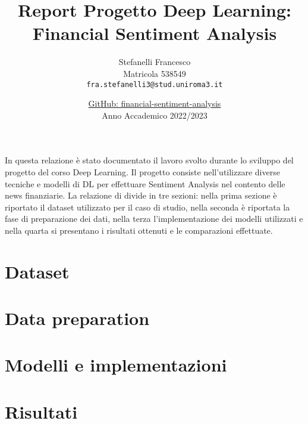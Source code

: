 \documentclass[11pt, english]{article}
\author{
 Stefanelli Francesco \\
 Matricola 538549\\
 \texttt{fra.stefanelli3@stud.uniroma3.it}
}
\title{\huge\textbf{Report Progetto Deep Learning: Financial Sentiment Analysis }}
\date{\href{https://github.com/Francesco9932/financial-sentiment-analysis}{GitHub: financial-sentiment-analysis}\\ Anno Accademico 2022/2023}
\begin{document}
\maketitle
In questa relazione è stato documentato il lavoro svolto durante lo sviluppo del progetto del corso Deep Learning. Il progetto consiste nell'utilizzare diverse tecniche e modelli di DL per effettuare Sentiment Analysis nel contento delle news finanziarie.
La relazione di divide in tre sezioni: nella prima sezione è riportato il dataset utilizzato per il caso di studio, nella seconda è riportata la fase di preparazione dei dati, nella terza l'implementazione dei modelli utilizzati e nella quarta si presentano i risultati ottenuti e le comparazioni effettuate.

\section{Dataset}


\section{\label{section:1}Data preparation}


\section{Modelli e implementazioni}


\section{Risultati}



\end{document}
